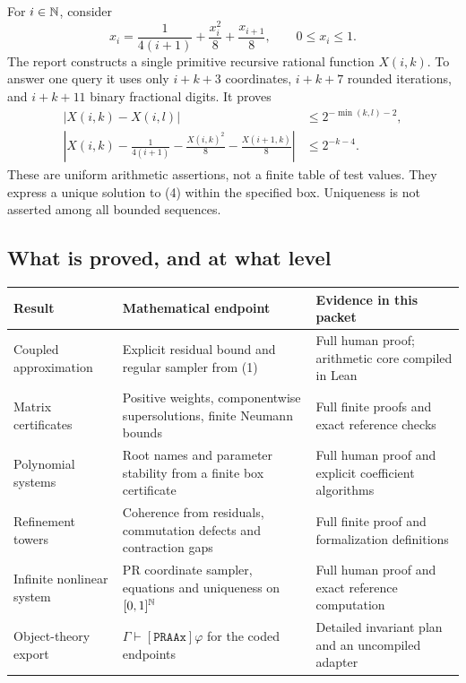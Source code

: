 For \(i\in\mathbb N\), consider
\[
 x_i=\frac1{4(i+1)}+\frac{x_i^2}{8}+\frac{x_{i+1}}8,
 \qquad 0\le x_i\le1.                         \tag{4}\label{eq:overview-lattice}
\]
The report constructs a single primitive recursive rational function
\(X(i,k)\). To answer one query it uses only
\(i+k+3\) coordinates, \(i+k+7\) rounded iterations, and
\(i+k+11\) binary fractional digits. It proves
\[
 \begin{split}
 |X(i,k)-X(i,l)|&\le2^{-\min(k,l)-2},\\
 \left|X(i,k)-\frac1{4(i+1)}-
 \frac{X(i,k)^2}{8}-\frac{X(i+1,k)}8\right|&\le2^{-k-4}.
 \end{split}                                                  \tag{5}
\]
These are uniform arithmetic assertions, not a finite table of test
values. They express a unique solution to (4) within the specified box.
Uniqueness is not asserted among all bounded sequences.

\subsection{What is proved, and at what level}

\begin{longtable}{@{}>{\raggedright\arraybackslash}p{}>{\raggedright\arraybackslash}p{}>{\raggedright\arraybackslash}p{}@{}}
\toprule
Result & Mathematical endpoint & Evidence in this packet\\
\midrule
\endhead
Coupled approximation & Explicit residual bound and regular sampler from
(1) & Full human proof; arithmetic core compiled in Lean\\
Matrix certificates & Positive weights, componentwise supersolutions,
finite Neumann bounds & Full finite proofs and exact reference checks\\
Polynomial systems & Root names and parameter stability from a finite
box certificate & Full human proof and explicit coefficient algorithms\\
Refinement towers & Coherence from residuals, commutation defects and
contraction gaps & Full finite proof and formalization definitions\\
Infinite nonlinear system & PR coordinate sampler, equations and uniqueness
on \([0,1]^{\mathbb N}\) & Full human proof and exact reference computation\\
Object-theory export & \(\Gamma\vdash[\texttt{PRAAx}]\varphi\) for the
coded endpoints & Detailed invariant plan and an uncompiled adapter\\
\bottomrule
\end{longtable}

